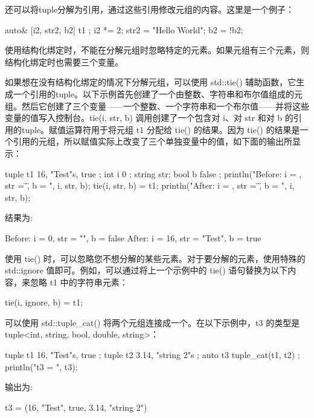 还可以将tuple分解为引用，通过这些引用修改元组的内容。这里是一个例子：

\begin{cpp}
auto& [i2, str2, b2] { t1 };
i2 *= 2;
str2 = "Hello World";
b2 = !b2;
\end{cpp}

使用结构化绑定时，不能在分解元组时忽略特定的元素。如果元组有三个元素，则结构化绑定时也需要三个变量。


如果想在没有结构化绑定的情况下分解元组，可以使用 std::tie() 辅助函数，它生成一个引用的tuple。以下示例首先创建了一个由整数、字符串和布尔值组成的元组。然后它创建了三个变量——一个整数、一个字符串和一个布尔值——并将这些变量的值写入控制台。tie(i, str, b) 调用创建了一个包含对 i、对 str 和对 b 的引用的tuple。赋值运算符用于将元组 t1 分配给 tie() 的结果。因为 tie() 的结果是一个引用的元组，所以赋值实际上改变了三个单独变量中的值，如下面的输出所显示：

\begin{cpp}
tuple t1 { 16, "Test"s, true };
int i { 0 };
string str;
bool b { false };
println("Before: i = {}, str = \"{}\", b = {}", i, str, b);
tie(i, str, b) = t1;
println("After: i = {}, str = \"{}\", b = {}", i, str, b);
\end{cpp}

结果为:

\begin{shell}
Before: i = 0, str = "", b = false
After: i = 16, str = "Test", b = true
\end{shell}

使用 tie() 时，可以忽略您不想分解的某些元素。对于要分解的元素，使用特殊的 std::ignore 值即可。例如，可以通过将上一个示例中的 tie() 语句替换为以下内容，来忽略 t1 中的字符串元素：

\begin{cpp}
tie(i, ignore, b) = t1;
\end{cpp}


可以使用 std::tuple\_cat() 将两个元组连接成一个。在以下示例中，t3 的类型是 tuple<int, string, bool, double, string>：

\begin{cpp}
tuple t1 { 16, "Test"s, true };
tuple t2 { 3.14, "string 2"s };
auto t3 { tuple_cat(t1, t2) };
println("t3 = {}", t3);
\end{cpp}

输出为:

\begin{shell}
t3 = (16, "Test", true, 3.14, "string 2")
\end{shell}

